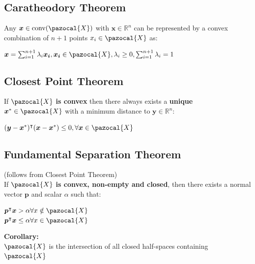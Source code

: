 \documentclass[english]{latex4ei/latex4ei_sheet}
\begin{document}
\begin{sectionbox}
    \subsection{Caratheodory Theorem}
	\vspace{0.3em}
	Any $\bm{x} \in \text{conv}(\pazocal{X})$ with $\bm{x} \in \mathbb{R}^n$ can be represented by a convex combination of $n+1$ points $x_i \in \pazocal{X}$ as: \\
	
	\begin{center}
		$\bm{x} = \sum_{i=1}^{n+1} \lambda_i \bm{x_i}, \bm{x_i} \in \pazocal{X}, \lambda_i \geq 0, \sum_{i=1}^{n+1} \lambda_i = 1$
	\end{center}

\end{sectionbox}

\begin{sectionbox}
	\subsection{Closest Point Theorem}
	\vspace{0.3em}
	If $\pazocal{X}$ \textbf{is convex} then there always exists a \textbf{unique} $\bm{x}^* \in \pazocal{X}$ with a minimum distance to $\bm{y} \in \mathbb{R}^n$: \\
	
	\begin{center}
		$(\bm{y} - \bm{x}^*)^\intercal(\bm{x} - \bm{x}^*) \leq 0, \forall \bm{x} \in \pazocal{X}$
	\end{center} 
	
\end{sectionbox}

\begin{sectionbox}
	\subsection{Fundamental Separation Theorem}
	\vspace{0.3em}
	(follows from Closest Point Theorem) \\
	If $\pazocal{X}$ \textbf{is convex, non-empty and closed}, then there exists a normal vector $\bm{p}$ and scalar $\alpha$ such that: \\
	
	\begin{center}
		$\bm{p}^\intercal\bm{x} > \alpha \forall x \notin \pazocal{X}$ \\
		$\bm{p}^\intercal\bm{x} \leq \alpha \forall x \in \pazocal{X}$
	\end{center}

	\textbf{Corollary:} \\
	$\pazocal{X}$ is the intersection of all closed half-spaces containing $\pazocal{X}$
	
\end{sectionbox}
\end{document}
